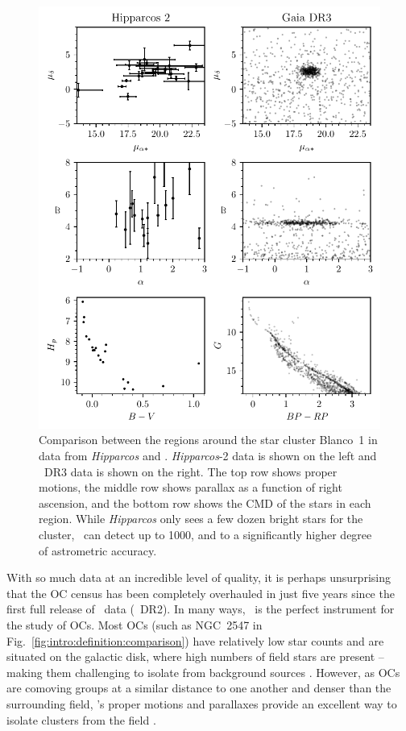 \begin{figure}[p]
	\centering
	\includegraphics[width=\textwidth]{fig/c1/gaia_hipparcos_oc_comparison.pdf}
	\caption[Comparison between the regions around the star cluster Blanco~1 in data from \emph{Hipparcos} and \gaia]{Comparison between the regions around the star cluster Blanco~1 in data from \emph{Hipparcos} and \gaia. \emph{Hipparcos}-2 data \citep{vanleeuwen_hipparcos_new_2007} is shown on the left and \gaia\ DR3 data \citep{gaia_collaboration_gaia_2022} is shown on the right. The top row shows proper motions, the middle row shows parallax as a function of right ascension, and the bottom row shows the CMD of the stars in each region. While \emph{Hipparcos} only sees a few dozen bright stars for the cluster, \gaia\ can detect up to 1000, and to a significantly higher degree of astrometric accuracy.}
	\label{fig:intro:history:gaia_blanco_1}
\end{figure}

With so much data at an incredible level of quality, it is perhaps unsurprising that the OC census has been completely overhauled in just five years since the first full release of \gaia\ data (\gaia\ DR2). In many ways, \gaia\ is the perfect instrument for the study of OCs. Most OCs (such as NGC~2547 in Fig.~\ref{fig:intro:definition:comparison}) have relatively low star counts and are situated on the galactic disk, where high numbers of field stars are present -- making them challenging to isolate from background sources \citep{kharchenko_global_2012}. However, as OCs are comoving groups at a similar distance to one another and denser than the surrounding field, \gaia's proper motions and parallaxes provide an excellent way to isolate clusters from the field \citep{gaiacollaboration_gaia_data_2017,cantat-gaudin_characterising_2018}.

